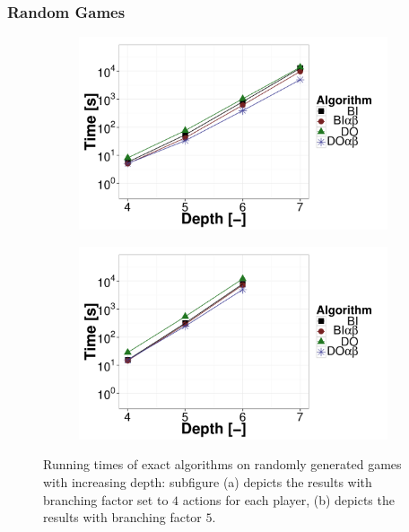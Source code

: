 \subsubsection{Random Games}
\begin{figure}[t]
\centering
	\begin{subfigure}{0.49\textwidth}
		\includegraphics[width=1\textwidth]{figures/RG-BF4-BIN-FALSE.pdf}\caption{}\label{fig:off:res:rgbf4}
	\end{subfigure}
	\begin{subfigure}{0.49\textwidth}
		\includegraphics[width=1\textwidth]{figures/RG-BF5-BIN-FALSE.pdf}\caption{}\label{fig:off:res:rgbf5}
	\end{subfigure}
\caption{Running times of exact algorithms on randomly generated games with increasing depth: subfigure (a) depicts the results with branching factor set to $4$ actions for each player, (b) depicts the results with branching factor $5$.} \label{fig:off:res:rg}
\end{figure}

